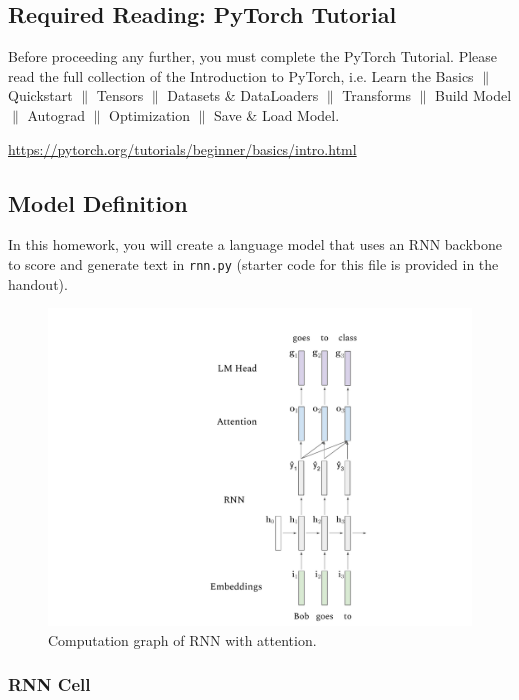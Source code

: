 \documentclass[11pt,addpoints,answers]{exam}
\begin{document}
\subsection{Required Reading: PyTorch Tutorial}

Before proceeding any further, you must complete the PyTorch Tutorial. Please read the full collection of the Introduction to PyTorch, i.e. Learn the Basics $\|$ Quickstart $\|$ Tensors $\|$ Datasets \& DataLoaders $\|$ Transforms $\|$ Build Model $\|$ Autograd $\|$ Optimization $\|$ Save \& Load Model.    

    \url{https://pytorch.org/tutorials/beginner/basics/intro.html}
    

\subsection{Model Definition}\label{model}
In this homework, you will create a language model that uses an RNN backbone to score and generate text in \texttt{rnn.py} (starter code for this file is provided in the handout).

\begin{figure}[htp]
    \centering
    \includegraphics[scale=0.5]{figs/rnn_diagram.pdf}
    \caption{Computation graph of RNN with attention.}
    \label{fig:enter-label}
\end{figure}

\subsubsection{RNN Cell}
\end{document}
